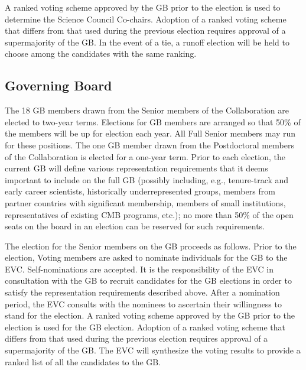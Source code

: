 \documentclass[12pt]{article}
\begin{document}
A ranked voting scheme approved by the GB prior to the election is used to determine the Science Council Co-chairs. Adoption of a ranked voting scheme that differs from that used during the previous election requires approval of a supermajority of the GB. In the event of a tie, a runoff election will be held to choose among the candidates with the same ranking.

\bigskip
\subsection{Governing Board}
\label{sec:gb-elections}

The 18 GB members drawn from the Senior members of the Collaboration are elected to two-year terms. Elections for GB members are arranged so that 50\% of the members will be up for election each year. All Full Senior members may run for these positions. The one GB member drawn from the Postdoctoral members of the Collaboration is elected for a one-year term. Prior to each election, the current GB will define various representation requirements that it deems important to include on the full GB (possibly including, e.g., tenure-track and early career scientists,  historically underrepresented groups, members from partner countries with significant membership, members of small institutions, representatives of existing CMB programs, etc.); no more than 50\% of the open seats on the board in an election can be reserved for such requirements.

The election for the Senior members on the GB proceeds as follows.
Prior to the election, Voting members are asked to nominate individuals for the GB to the EVC. Self-nominations are accepted. It is the responsibility of the EVC in consultation with the GB to recruit candidates for the GB elections in order to satisfy the representation requirements described above. After a nomination period, the EVC consults with the nominees to ascertain their willingness to stand for the election. A ranked voting scheme approved by the GB prior to the election is used for the GB election. Adoption of a ranked voting scheme that differs from that used during the previous election requires approval of a supermajority of the GB. The EVC will synthesize the voting results to provide a ranked list of all the candidates to the GB.
\end{document}

